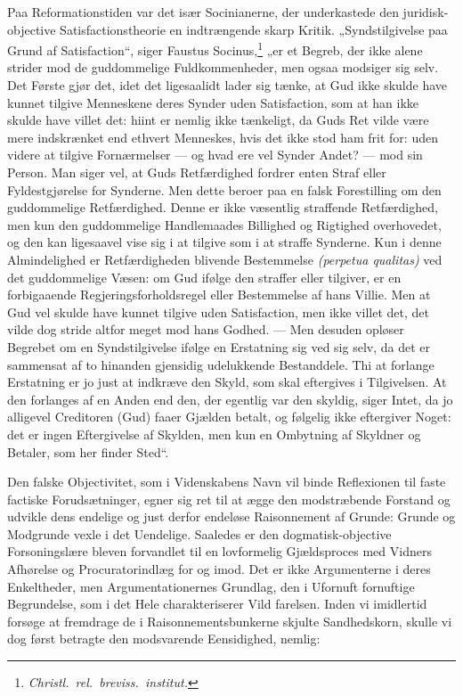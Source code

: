 \documentclass[12pt]{book}
\begin{document}
Paa Reformationstiden var det især Socinianerne, der underkastede
den juridisk-objective Satisfactionstheorie en indtrængende skarp
Kritik. „Syndstilgivelse paa Grund af Satisfaction“, siger Faustus
Socinus,\footnote{\textit{Christl.\ rel.\ breviss.\ institut.}} „er
et Begreb, der ikke alene strider mod de guddommelige
Fuldkommenheder, men ogsaa modsiger sig selv. Det Første gjør det,
idet det ligesaalidt lader sig tænke, at Gud ikke skulde have kunnet
tilgive Menneskene deres Synder uden Satisfaction, som at han ikke
skulde have villet det: hiint er nemlig ikke tænkeligt, da Guds Ret
vilde være mere indskrænket end ethvert Menneskes, hvis det ikke
stod ham frit for: uden videre at tilgive Fornærmelser ---
og hvad ere vel Synder Andet? --- mod sin Person. Man siger vel, at
Guds Retfærdighed fordrer enten Straf eller Fyldestgjørelse for
Synderne. Men dette beroer paa en falsk Forestilling om den
guddommelige Retfærdighed. Denne er ikke væsentlig straffende
Retfærdighed, men kun den guddommelige Handlemaades Billighed og
Rigtighed overhovedet, og den kan ligesaavel vise sig i at tilgive
som i at straffe Synderne. Kun i denne Almindelighed er
Retfærdigheden blivende Bestemmelse \textit{(perpetua qualitas)} ved
det guddommelige Væsen: om Gud ifølge den straffer eller tilgiver,
er en forbigaaende Regjeringsforholdsregel eller Bestemmelse af hans
Villie. Men at Gud vel skulde have kunnet tilgive uden Satisfaction,
men ikke villet det, det vilde dog stride altfor meget mod hans
Godhed. --- Men desuden opløser Begrebet om en Syndstilgivelse
ifølge en Erstatning sig ved sig selv, da det er sammensat af to
hinanden gjensidig udelukkende Bestanddele. Thi at forlange
Erstatning er jo just at indkræve den Skyld, som skal eftergives i
Tilgivelsen. At den forlanges af en Anden end den, der egentlig var
den skyldig, siger Intet, da jo alligevel Creditoren (Gud) faaer
Gjælden betalt, og følgelig ikke eftergiver Noget: det er ingen
Eftergivelse af Skylden, men kun en Ombytning af Skyldner og
Betaler, som her finder Sted“.

Den falske Objectivitet, som i Videnskabens Navn vil binde
Reflexionen til faste factiske Forudsætninger, egner sig ret til at
ægge den modstræbende Forstand og udvikle dens endelige og just
derfor endeløse Raisonnement af Grunde: Grunde og Modgrunde vexle i
det Uendelige. Saaledes er den dogmatisk-objective Forsoningslære
bleven forvandlet til en lovformelig Gjældsproces med Vidners
Afhørelse og Procuratorindlæg for og imod. Det er ikke Argumenterne
i deres Enkeltheder, men Argumentationernes Grundlag, den i Ufornuft
fornuftige Begrundelse, som i det Hele charakteriserer Vild\-
farelsen. Inden vi imidlertid forsøge at fremdrage de i
Raisonnementsbunkerne skjulte Sandhedskorn, skulle vi dog først
betragte den modsvarende Eensidighed, nemlig:
\end{document}
